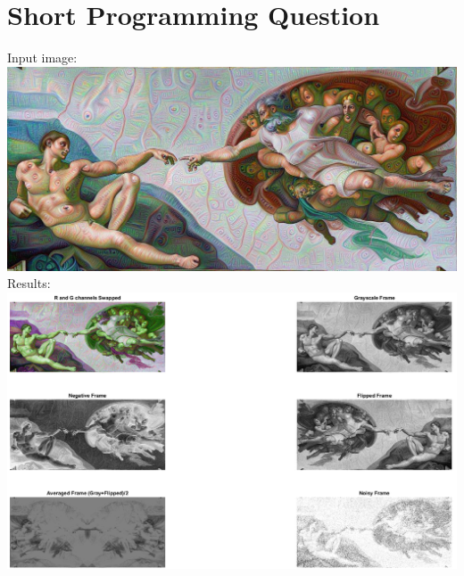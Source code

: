 \documentclass{article}
\begin{document}
\section{Short Programming Question}
	Input image: \\ 
	\includegraphics[width=\textwidth]{plots/2/inputPS0Q2.jpg}
	Results: \\
	\includegraphics[width=\textwidth]{plots/2/subplot.png}
\end{document}
